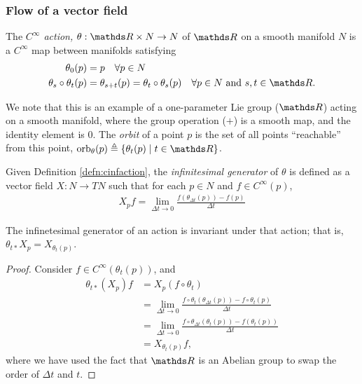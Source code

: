 \subsubsection{Flow of a vector field}

\begin{defn}\label{defn:cinfaction}
The \textit{$C^{\infty}$ action,} $\theta:\R \times N \rightarrow N$ of $\R$ on a smooth manifold $N$ is a $C^{\infty}$ map between manifolds satisfying
\begin{equation}
\begin{aligned}
\theta_0(p) &= p \quad \forall p\in N\\
\theta_s \circ \theta_t (p) &= \theta_{s+t}(p) = \theta_t\circ \theta_s (p) \quad \forall p\in N \text{ and } s, t \in \R. 
\end{aligned}%
\end{equation}
\end{defn}

We note that this is an example of a one-parameter Lie group ($\R$) acting on a smooth manifold, where the group operation ($+$) is a smooth map, and the identity element is $0$. The \textit{orbit} of a point $p$ is the set of all points ``reachable'' from this point, $\text{orb}_{\theta}(p) \triangleq \left\{\theta_t(p) \mid t\in \R \right\}$. 

\begin{defn}
Given Definition \ref{defn:cinfaction}, the \textit{infinitesimal generator} of $\theta$ is defined as a vector field $X:N\rightarrow TN$ such that for each $p\in N$ and $f\in C^{\infty}(p)$, 
\begin{align}
X_pf = \lim_{\Delta t \rightarrow 0}\frac{f\left(\theta_{\Delta t}(p)\right)-f(p)}{\Delta t}
\end{align}
\end{defn}
\begin{thm}\label{thm:infgen_invariance}
The infinetesimal generator of an action is invariant under that action; that is, $\theta_{t*}X_p = X_{\theta_{t}(p)}$.\end{thm} 
\begin{proof} Consider $f\in C^{\infty}(\theta_t(p))$, and 
\begin{equation}\begin{aligned}\label{eq:infgen_invariance}
\theta_{t*}(X_p)f &={} X_p\left(f\circ \theta_t\right)\\
&={} \lim_{\Delta t \rightarrow 0}\frac{f\circ \theta_t\left(\theta_{\Delta t}(p)\right)-f\circ \theta_t(p)}{\Delta t}\\
&={} \lim_{\Delta t \rightarrow 0}\frac{f\circ \theta_{\Delta t}\left(\theta_{t}(p)\right)-f(\theta_t(p))}{\Delta t}\\
&={} X_{\theta_t(p)}f, 
\end{aligned}\end{equation}
where we have used the fact that $\R$ is an Abelian group to swap the order of $\Delta t$ and $t$. \end{proof}

